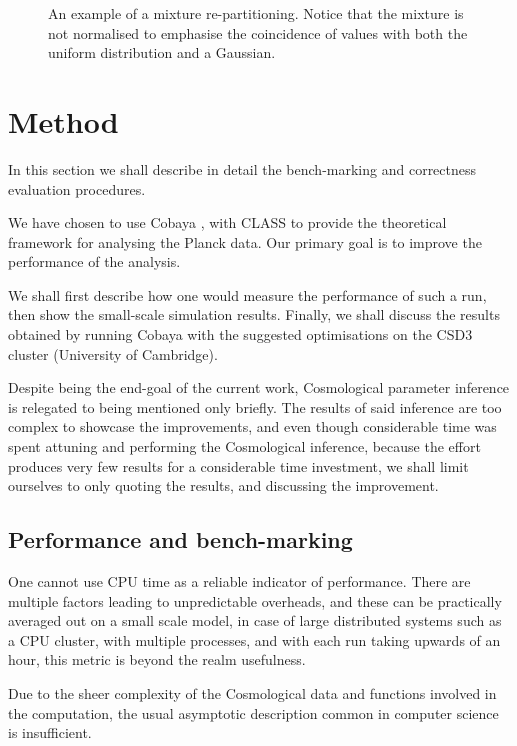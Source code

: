 \documentclass[usenatbib]{mnras}
\begin{document}
\begin{figure}
 
\caption{\label{orgfc4a714}
An example of a mixture re-partitioning. Notice that the mixture is not normalised to emphasise the coincidence of values with both the uniform distribution and a Gaussian.}
\end{figure}



\section{Method}
\label{sec:org09fe641}
In this section we shall describe in detail the bench-marking and
correctness evaluation procedures. 



We have chosen to use Cobaya \citep{cobaya}, with CLASS to provide the
theoretical framework for analysing the Planck \citep{Planck}
data. Our primary goal is to improve the performance of the
analysis.

We shall first describe how one would measure the performance of
such a run, then show the small-scale simulation results. Finally,
we shall discuss the results obtained by running Cobaya with the
suggested optimisations on the CSD3 cluster (University of Cambridge).

Despite being the end-goal of the current work, Cosmological
parameter inference is relegated to being mentioned only
briefly. The results of said inference are too complex to showcase
the improvements, and even though considerable time was spent
attuning and performing the Cosmological inference, because the
effort produces very few results for a considerable time investment,
we shall limit ourselves to only quoting the results, and discussing
the improvement.  


\subsection{Performance and bench-marking}
\label{sec:org643a0a4}
One cannot use CPU time as a reliable indicator of
performance. There are multiple factors leading to unpredictable
overheads, and these can be practically averaged out on a small
scale model, in case of large distributed systems such as a CPU
cluster, with multiple processes, and with each run taking upwards
of an hour, this metric is beyond the realm usefulness.

Due to the sheer complexity of the Cosmological data and functions
involved in the computation, the usual asymptotic description
common in computer science is insufficient. 
\end{document}
